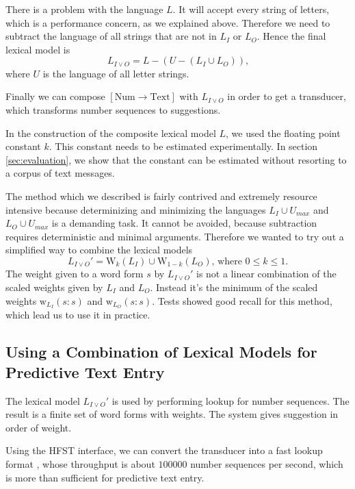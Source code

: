\documentclass[a4paper,conference]{IEEEtran}
\begin{document}
There is a problem with the language $L$. It will accept every
string of letters, which is a performance concern, as we explained
above. Therefore we need to subtract the language of all strings that
are not in $L_I$ or $L_O$. Hence the final lexical model is
\begin{equation}L_{I\vee O} = L - (U - (L_I \cup L_O))\text{,}\end{equation}
where $U$ is the language of all letter strings.

Finally we can compose $[\mathrm{Num}\rightarrow\mathrm{Text}]$ with
$L_{I\vee O}$ in order to get a transducer, which transforms number
sequences to suggestions.

In the construction of the composite lexical model $L$, we used the floating
point constant $k$. This constant needs to be estimated
experimentally. In section \ref{sec:evaluation}, we show that the
constant can be estimated without resorting to a corpus of text messages.

The method which we described is fairly contrived and extremely
resource intensive because determinizing and minimizing the languages
$L_I \cup U_{max}$ and $L_O \cup U_{max}$ is a demanding task. It
cannot be avoided, because subtraction requires deterministic and
minimal arguments. Therefore we wanted to try out a simplified way to
combine the lexical models
\begin{equation}
  L_{I\vee O}' = \mathrm{W}_k(L_I) \cup \mathrm{W}_{1-k}(L_O)\text{, where }0 \leq k \leq 1\text{.}
\end{equation} 
The weight given to a word form $s$ by $L_{I\vee O}'$ is not a linear
combination of the scaled weights given by $L_I$ and $L_O$. Instead
it's the minimum of the scaled weights
$\mathrm{w}_{L_I}(s\mathrm{:}s)$ and $\mathrm{w}_{L_O}(s\mathrm{:}s)$.
Tests showed good recall for this method, which lead us to use it in
practice.

\subsection{Using a Combination of Lexical Models for Predictive Text Entry}

The lexical model $L_{I\vee O}'$ is used by performing lookup for number
sequences. The result is a finite set of word forms with weights. The
system gives suggestion in order of weight.

Using the HFST interface, we can convert the transducer into a fast
lookup format \cite{conf/fsmnlp/Silfverberg2009}, whose throughput is
about $100000$ number sequences per second, which is more than
sufficient for predictive text entry.
\end{document}

